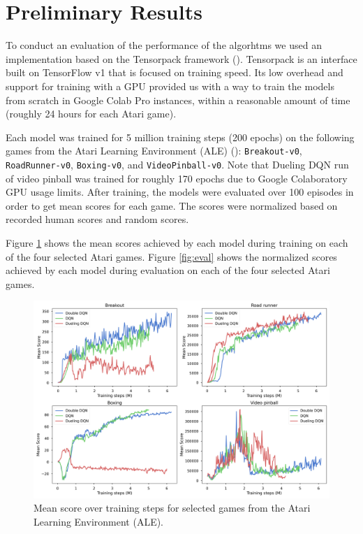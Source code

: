\documentclass{article}
\begin{document}
\section{Preliminary Results}
To conduct an evaluation of the performance of the algorhtms we used an
implementation based on the Tensorpack framework (\cite{wu2016tensorpack}).
Tensorpack is an interface built on TensorFlow v1 that is focused on training
speed. Its low overhead and support for training with a GPU provided us with a
way to train the models from scratch in Google Colab Pro instances, within a
reasonable amount of time (roughly 24 hours for each Atari game). 

Each model was trained for 5 million training steps (200 epochs) on the
following games from the Atari Learning Environment (ALE)
(\cite{bellemare2013arcade}): \texttt{Breakout-v0}, \texttt{RoadRunner-v0},
\texttt{Boxing-v0}, and \texttt{VideoPinball-v0}. Note that Dueling DQN run of video 
pinball was trained for roughly 170 epochs due to Google Colaboratory GPU usage 
limits. After training, the models were evaluated over 100 episodes in order to get 
mean scores for each game. The scores were normalized based on recorded human scores 
and random scores.

Figure \ref{fig:training} shows the mean scores achieved by each model during
training on each of the four selected Atari games. Figure \ref{fig:eval} shows the
normalized scores achieved by each model during evaluation on each of the four 
selected Atari games.

\begin{figure}[ht]
    \centering
    \includegraphics[width=\linewidth]{double_dqn-mean_scores.png}
    \caption{Mean score over training steps for selected games from the Atari
    Learning Environment (ALE).}
    \label{fig:training}
\end{figure}
\end{document}
